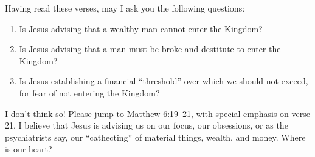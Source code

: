\documentclass[12pt]{memoir}
\begin{document}
Having read these verses, may I ask you the following questions:
\begin{enumerate}
\item Is Jesus advising that a wealthy man cannot enter the Kingdom? 
\item Is Jesus advising that a man must be broke and destitute to enter
the Kingdom? 
\item Is Jesus establishing a financial ``threshold'' over which we should
not exceed, for fear of not entering the Kingdom? 
\end{enumerate}
I don't think so! Please jump to Matthew 6:19--21, with special emphasis
on verse 21. I believe that Jesus is advising us on our focus, our
obsessions, or as the psychiatrists say, our ``cathecting'' of material
things, wealth, and money. Where is our heart? 
\end{document}
